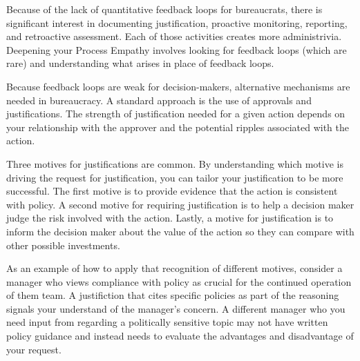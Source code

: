 Because of the lack of quantitative feedback loops for bureaucrats, there is significant interest in documenting justification, proactive monitoring, reporting, and retroactive assessment. Each of those activities creates more administrivia. Deepening your Process Empathy involves looking for feedback loops (which are rare) and understanding what arises in place of feedback loops.


Because feedback loops are weak for decision-makers, alternative mechanisms are needed in bureaucracy. A standard approach is the use of approvals and justifications. The strength of justification needed for a given action depends on your relationship with the approver and the potential ripples associated with the action. 


Three motives for justifications are common. By understanding which motive is driving the request for justification, you can tailor your justification to be more successful. The first motive is to provide evidence that the action is consistent with policy. A second motive for requiring justification is to help a decision maker judge the risk involved with the action. Lastly, a motive for justification is to inform the decision maker about the value of the action so they can compare with other possible investments. 

As an example of how to apply that recognition of different motives, consider a manager who views compliance with policy as crucial for the continued operation of them team. A justifiction that cites specific policies as part of the reasoning signals your understand of the manager's concern. A different manager who you need input from regarding a politically sensitive topic may not have written policy guidance and instead needs to evaluate the advantages and disadvantage of your request.


